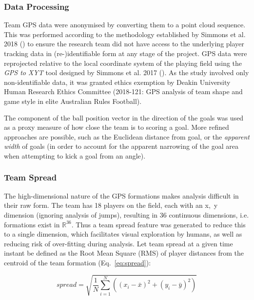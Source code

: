 \subsubsection{Data Processing}

Team GPS data were anonymised by converting them to a point cloud sequence. This was performed according to the methodology established by Simmons et al. 2018 \cite{Simmons2018} () to ensure the research team did not have access to the underlying player tracking data in (re-)identifiable form at any stage of the project. GPS data were reprojected relative to the local coordinate system of the playing field using the \textit{GPS to XYT} tool designed by Simmons et al. 2017 \cite{Simmons2017} (). As the study involved only non-identifiable data, it was granted ethics exemption by Deakin University Human Research Ethics Committee (2018-121: GPS analysis of team shape and game style in elite Australian Rules Football).

The component of the ball position vector in the direction of the goals was used as a proxy measure of how close the team is to scoring a goal. More refined approaches are possible, such as the Euclidean distance from goal, or the \textit{apparent width} \cite{Jackson2016} of goals (in order to account for the apparent narrowing of the goal area when attempting to kick a goal from an angle).

\subsubsection{Team Spread}

The high-dimensional nature of the GPS formations makes analysis difficult in their raw form. The team has 18 players on the field, each with an x,~y dimension (ignoring analysis of jumps), resulting in 36 continuous dimensions, i.e. formations exist in $\mathbb{R}^{36}$. Thus a team spread feature was generated to reduce this to a single dimension, which facilitates visual exploration by humans, as well as reducing risk of over-fitting during analysis. Let team spread at a given time instant be defined as the Root Mean Square (RMS) of player distances from the centroid of the team formation (Eq.~\ref{eq:spread}):

\begin{equation} \label{eq:spread}
spread=\sqrt{\frac{1}{N} \sum_{i=1}^{N} \left((x_i - \bar{x})^2 + (y_i - \bar{y})^2\right)}
\end{equation}

